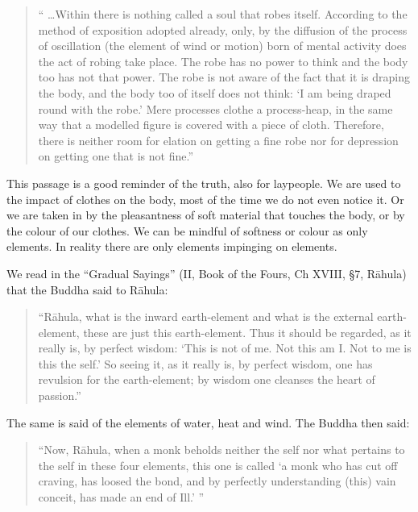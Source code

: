 \documentclass{book}
\begin{document}
\begin{quote}\begin{flushleft}
`` \ldots Within there is nothing called a soul that robes itself. According
to the method of exposition adopted already, only, by the diffusion of
the process of oscillation (the element of wind or motion) born of
mental activity does the act of robing take place. The robe has no
power to think and the body too has not that power. The robe is not
aware of the fact that it is draping the body, and the body too of
itself does not think: `I am being draped round with the robe.' Mere
processes clothe a process-heap, in the same way that a modelled
figure is covered with a piece of cloth. Therefore, there is neither
room for elation on getting a fine robe nor for depression on getting
one that is not fine.''
\end{flushleft}\end{quote}


This passage is a good reminder of the truth, also for laypeople. We are
used to the impact of clothes on the body, most of the time we do not
even notice it. Or we are taken in by the pleasantness of soft material
that touches the body, or by the colour of our clothes. We can be
mindful of softness or colour as only elements. In reality there are
only elements impinging on elements. 

We read in the ``Gradual Sayings'' (II, Book of the Fours, Ch XVIII,
{\S}7, R{\=a}hula) that the Buddha said to R{\=a}hula:

\begin{quote}\begin{flushleft}

``R{\=a}hula, what is the inward earth-element and what is the
external earth-element, these are just this earth-element. Thus it
should be regarded, as it really is, by perfect wisdom: `This is not of
me. Not this am I. Not to me is this the self.' So seeing it, as it
really is, by perfect wisdom, one has revulsion for the
earth-element; by wisdom one cleanses the heart of passion.''

\end{flushleft}\end{quote}



The same is said of the elements of water, heat and wind. The Buddha
then said:

\begin{quote}\begin{flushleft}
``Now, R{\=a}hula, when a monk beholds neither the self nor what
pertains to the self in these four elements, this one is called `a monk
who has cut off craving, has loosed the bond, and by perfectly
understanding (this) vain conceit, has made an end of Ill.' ''
\end{flushleft}\end{quote}
\end{document}
